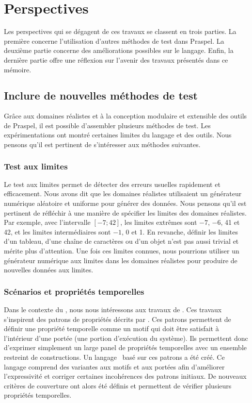 \section{Perspectives}
\label{section:conclusions:perspectives}

Les perspectives qui se dégagent de ces travaux se classent en trois parties. La
première concerne l'utilisation d'autres méthodes de test dans Praspel. La
deuxième partie concerne des améliorations possibles sur le langage. Enfin, la
dernière partie offre une réflexion sur l'avenir des travaux présentés dans ce
mémoire.

\subsection{Inclure de nouvelles méthodes de test}

Grâce aux domaines réalistes et à la conception modulaire et extensible des
outils de Praspel, il est possible d'assembler plusieurs méthodes de test. Les
expérimentations ont montré certaines limites du langage et des outils. Nous
pensons qu'il est pertinent de s'intéresser aux méthodes suivantes.

\subsubsection{Test aux limites}

Le test aux limites permet de détecter des erreurs usuelles rapidement et
efficacement. Nous avons dit que les domaines réalistes utilisaient un
générateur numérique aléatoire et uniforme pour générer des données. Nous
pensons qu'il est pertinent de réfléchir à une manière de spécifier les limites
des domaines réalistes. Par exemple, avec l'intervalle $[-7; 42]$, les limites
extrêmes sont $-7$, $-6$, 41 et 42, et les limites intermédiaires sont $-1$, 0
et 1. En revanche, définir les limites d'un tableau, d'une chaîne de caractères
ou d'un objet n'est pas aussi trivial et mérite plus d'attention. Une fois ces
limites connues, nous pourrions utiliser un générateur numérique aux limites
dans les domaines réalistes pour produire de nouvelles données aux limites.

\subsubsection{Scénarios et propriétés temporelles}

Dans le contexte du , nous nous intéressons
aux travaux de . Ces travaux s'inspirent des patrons de
propriétés décrits par . Ces patrons permettent de définir une
propriété temporelle comme un motif qui doit être satisfait à l'intérieur d'une
portée (une portion d'exécution du système). Ils permettent donc d'exprimer
simplement un large panel de propriétés temporelles avec un ensemble restreint
de constructions. Un langage~ basé sur ces patrons a été
créé. Ce langage comprend des variantes aux motifs et aux portées afin
d'améliorer l'expressivité et corriger certaines incohérences des patrons
initiaux. De nouveaux critères de couverture ont alors été définis et permettent
de vérifier plusieurs propriétés temporelles.


